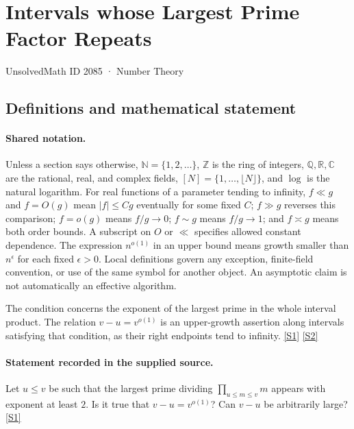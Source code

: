 \documentclass[11pt,a4paper]{article}
\newcommand{\N}{\mathbb{N}}
\newcommand{\Z}{\mathbb{Z}}
\newcommand{\Q}{\mathbb{Q}}
\newcommand{\R}{\mathbb{R}}
\newcommand{\C}{\mathbb{C}}
\newcommand{\sref}[2]{\hyperlink{source:#1:#2}{[S#2]}}
\begin{document}

\setcounter{section}{2084}

\section{Intervals whose Largest Prime Factor Repeats}\label{2085}

{\small\sffamily UnsolvedMath ID 2085 · Number Theory}

\subsection{Definitions and mathematical statement}

\paragraph{Shared notation.}Unless a section says otherwise, $\N=\{1,2,\ldots\}$,
$\Z$ is the ring of integers, $\Q,\R,\C$ are the rational, real, and complex
fields, $[N]=\{1,\ldots,\lfloor N\rfloor\}$, and $\log$ is the natural
logarithm. For real functions of a parameter tending to infinity,
$f\ll g$ and $f=O(g)$ mean $|f|\leq Cg$ eventually for some fixed $C$;
$f\gg g$ reverses this comparison; $f=o(g)$ means $f/g\to0$;
$f\sim g$ means $f/g\to1$; and $f\asymp g$ means both order bounds.
A subscript on $O$ or $\ll$ specifies allowed constant dependence.
The expression $n^{o(1)}$ in an upper bound means growth smaller than
$n^\epsilon$ for each fixed $\epsilon>0$. Local definitions govern any
exception, finite-field convention, or use of the same symbol for another
object. An asymptotic claim is not automatically an effective algorithm.



The condition concerns the exponent of the largest prime in the whole interval product. The relation $v-u=v^{o(1)}$ is an upper-growth assertion along intervals satisfying that condition, as their right endpoints tend to infinity. \sref{2085}{1} \sref{2085}{2}

\paragraph{Statement recorded in the supplied source.}
Let $u\leq v$ be such that the largest prime dividing $\prod_{u\leq m\leq v}m$ appears with exponent at least $2$. Is it true that $v-u=v^{o(1)}$? Can $v-u$ be arbitrarily large? \sref{2085}{1}
\end{document}
